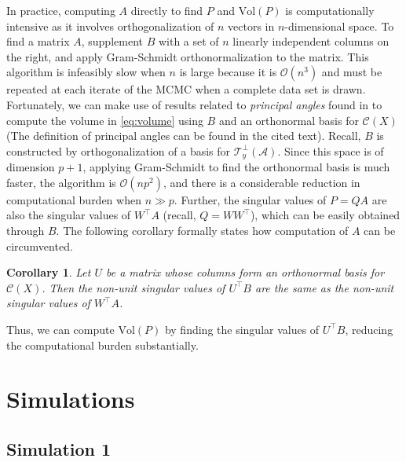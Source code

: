\documentclass[12pt]{article}
\newcommand{\mc}{\mathcal}
\newtheorem{corollary}[theorem]{\bf Corollary}
\begin{document}
In practice, computing $A$ directly to find $P$ and $\text{Vol} (P)$ is computationally intensive as it involves orthogonalization of $n$ vectors in $n$-dimensional space. 
To find a matrix $A$, supplement $B$ with a set of $n$ linearly independent columns on the right, and apply Gram-Schmidt 
orthonormalization to the matrix.  This algorithm is infeasibly slow when $n$ is large because it is $\mc O(n^3)$ and must be repeated at each
iterate of the MCMC when a complete data set is drawn.  
Fortunately, we can make use of results related to \textit{principal angles} found in \cite{miao1992} to compute the volume in \eqref{eq:volume} using $B$ and an orthonormal basis for $\mc C (X)$ (The definition of principal angles can be found in the cited text). Recall, $B$ is constructed by orthogonalization of a basis for $\mc T_{y}^\perp(\mc A)$. Since this space is of dimension $p+1$, applying Gram-Schmidt to find the orthonormal basis is much faster, the algorithm is $\mc O(np^2)$, and there is a 
considerable reduction in computational burden when $n \gg p$. 
Further, the singular values of $P=QA$ are also the singular values of
$W^\top A$ (recall, $Q=WW^{\top}$), which can be easily obtained through $B$.
The following corollary formally states how computation of $A$ can be circumvented. 
\begin{corollary}
\label{theorem:sings}
Let $U$ be a matrix whose columns
form an orthonormal basis for $\mc C (X)$. Then the non-unit singular
values of $U^\top B$ are the same as the non-unit singular values of $W^\top A$.  
\end{corollary} 
\noindent Thus, we can compute $\text{Vol} (P)$ by finding the singular values of $U^\top B$, reducing the computational burden substantially. 


%
%
\section{Simulations}
\subsection{Simulation 1}
\end{document}
